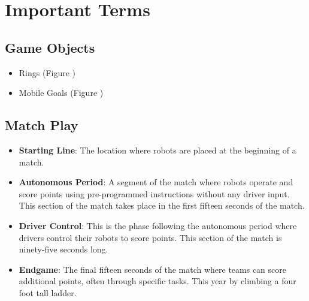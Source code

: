 \section*{Important Terms}
    \subsection*{Game Objects}
    \begin{itemize}
    \item Rings (Figure )
    \item Mobile Goals (Figure )
    \end{itemize}
    \subsection*{Match Play}
    \begin{itemize}
        \item \textbf{Starting Line}: The location where robots are placed at the beginning of a match.
        \item \textbf{Autonomous Period}: A segment of the match where robots operate and score points using pre-programmed instructions without any driver input. This section of the match takes place in the first fifteen seconds of the match.
        \item \textbf{Driver Control}: This is the phase following the autonomous period where drivers control their robots to score points. This section of the match is ninety-five seconds long.
        \item \textbf{Endgame}: The final fifteen seconds of the match where teams can score additional points, often through specific tasks. This year by climbing a four foot tall ladder.
    \end{itemize}
